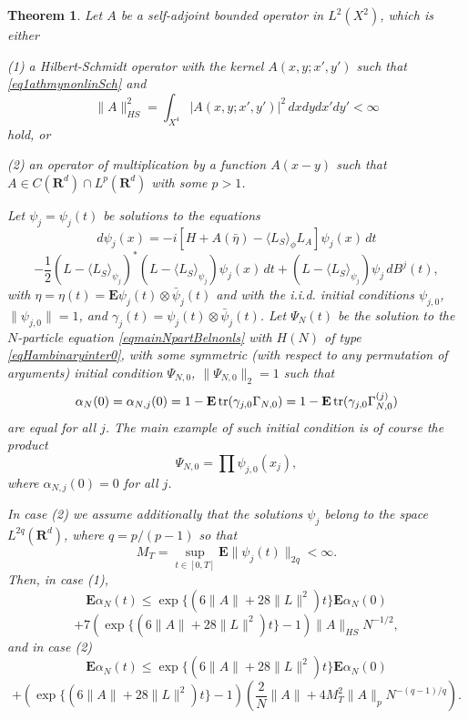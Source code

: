 \documentclass[12pt]{article}
\def\E{\mathbf{E}}
\def\R{\mathbf{R}}
\def\tr{\rm{tr}}
\def\al{\alpha}
\def\ga{\gamma}
\newtheorem{theorem}{Theorem}[section]
\newcommand{\Ga}{\Gamma}
\begin{document}
\begin{theorem}
\label{thmynonlinSch}
Let $A$ be a self-adjoint bounded operator in $L^2(X^2)$, which is either

(1) a Hilbert-Schmidt operator with
the kernel $A(x,y;x',y')$ such that \eqref{eq1athmynonlinSch} and
\begin{equation}
\label{eq1thmynonlinSch}
\|A\|^2_{HS}=\int_{X^4} |A(x,y;x',y')|^2 \, dx dy dx'dy' <\infty
\end{equation}
hold, or

(2) an operator of multiplication by a function $A(x-y)$
such that $A\in C(\R^d)\cap L^p(\R^d)$
with some $p>1$.

 Let $\psi_j=\psi_j(t)$ be solutions to the equations
\[
d\psi_j(x) =-i[H  +A(\bar \eta)
-\langle L_S \rangle_{\phi} L_A]  \psi_j(x) \, dt
\]
\begin{equation}
\label{eqmainnonlin}
-\frac12 (L-\langle L_S \rangle_{\psi_j})^* (L-\langle L_S \rangle_{\psi_j}) \psi_j(x)\,dt
+(L-\langle L_S \rangle_{\psi_j})\psi_j \, dB^j(t),
\end{equation}
with $\eta=\eta(t)=\E \psi_j(t)\otimes \bar \psi_j(t)$ and with the i.i.d. initial conditions
$\psi_{j,0}$, $\|\psi_{j,0}\|=1$, and $\ga_j(t)=\psi_j(t)\otimes \bar \psi_j(t)$.
Let $\Psi_N(t)$ be the solution to the $N$-particle equation \eqref{eqmainNpartBelnonls}
with $H(N)$ of type \eqref{eqHambinaryinter0}, with some symmetric (with respect to any
permutation of arguments) initial condition
$\Psi_{N,0}$, $\|\Psi_{N,0}\|_2=1$ such that
\[
\al_N(0)= \al_{N,j}(0)=1-\E \, {\tr} (\ga_{j,0} \Ga_{N,0})=1-\E \, {\tr} (\ga_{j,0} \Ga^{(j)}_{N,0})
\]
are equal for all $j$. The main example of such initial condition is of course the product
\[
\Psi_{N,0}=\prod \psi_{j,0}(x_j),
\]
where $\al_{N,j}(0)=0$ for all $j$.

In case (2) we assume additionally that the solutions $\psi_j$ belong to the space $L^{2q}(\R^d)$,
where $q=p/(p-1)$ so that
\[
M_T=\sup_{t\in [0,T]} \E \|\psi_j(t)\|_{2q}<\infty.
\]
Then, in case (1),
\[
\E \al_N(t) \le \exp\{ (6\|A\|+28 \|L\|^2)t\} \E \al_{N}(0)
\]
\begin{equation}
\label{eq2thmynonlinSch}
+7 \left(\exp\{ (6\|A\|+28 \|L\|^2)t\}-1\right)\|A\|_{HS} N^{-1/2},
\end{equation}
and in case (2)
\[
\E \al_N(t) \le \exp\{ (6\|A\| +28 \|L\|^2)t\} \E \al_{N}(0)
\]
\begin{equation}
\label{eq3thmynonlinSch}
+\left(\exp\{ (6\|A\|+28 \|L\|^2)t\}-1\right)
\left(\frac{2}{N}\|A\|+ 4 M_T^2 \|A\|_p N^{-(q-1)/q}\right).
\end{equation}

\end{theorem}
\end{document}
